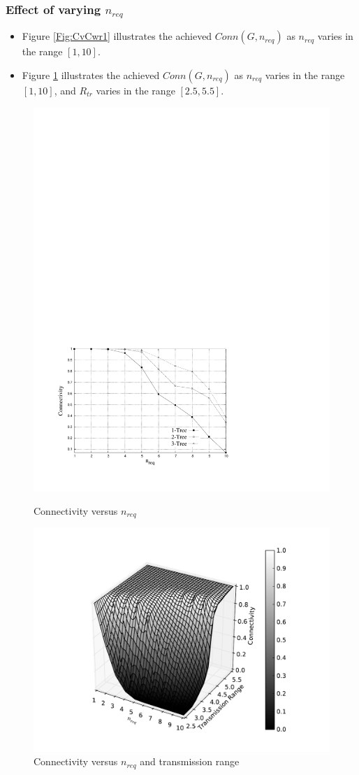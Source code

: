 \documentclass{beamer}
\begin{document}
\begin{frame}
\frametitle{Effect of varying $n_{req}$} 
\begin{itemize}
\item Figure \ref{Fig:CvCwr1} illustrates the achieved $Conn(G,n_{req})$ as $n_{req}$ varies in the range $[1,10]$.
\item Figure \ref{Fig:CvCwr2} illustrates the achieved $Conn(G,n_{req})$ as $n_{req}$ varies in the range $[1,10]$, and $R_{tr}$ varies in the range $[2.5,5.5]$.

\end{itemize}
\begin{figure}[!htb]
\begin{minipage}{0.5\linewidth}
\centering
\includegraphics[width=2 in, height=1.5 in]{abc.pdf}
\caption{Connectivity versus $n_{req}$}
\label{Fig:CvCwr1}
\end{minipage}
\begin{minipage}{0.45\linewidth}
\centering
\includegraphics[width=2 in, height=1.5 in]{3D.pdf}
\caption{Connectivity versus $n_{req}$ and transmission range}
\label{Fig:CvCwr2}
\end{minipage}
\end{figure}

\end{frame}
\end{document}

